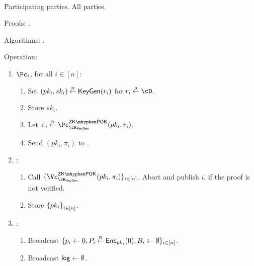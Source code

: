 \begin{protocol}~\label{prot:ConfidentialTransactions:Init}
	

	\item[Participating parties.] All parties.
			
			
	\item[Proofs:]   \piZKPOK{\rKeyGen}. 
	
	
	\item[Algorithms:]    \KeyGen.
	
			
\item[Operation:] ~
			
			
			\begin{enumerate}
				
				\item   $\Pc_i$, for  all $i\in [n]$:
				\begin{enumerate}
					\item Set $(pk_i,sk_i) \mathbin{\stackrel{\mbox{\tiny R}}{\leftarrow}} \mathsf{KeyGen}(r_i)$ for $r_i \getsr \cD$.
					
					\item Store $sk_i$.
					
					\item Let $\pi_i \getsr \pZKPOK{\rKeyGen}(pk_i,r_i)$.
					
					\item Send $(pk_i,\pi_i)$ to \Cc.
					
					
				\end{enumerate}
				
				\item \Cc:
				\begin{enumerate}
					
					\item Call $\sset{ \vZKPOK{\rKeyGen}(pk_i,\pi_i)}_{i\in [n]}$. Abort and publish $i$, if the \ith  proof is not verified. 
										
					\item Store $\set{pk_i}_{i\in [n]}$.
				\end{enumerate}
				
				
				\item \Cc: 
				\begin{enumerate}
					\item 	Broadcast $\{p_i \leftarrow 0, P_i\mathbin{\stackrel{\mbox{\tiny R}}{\leftarrow}} \mathsf{Enc}_{pk_i}(0),B_i\leftarrow \emptyset\}_{i\in [n]}$.
					
					\item    Broadcast $\mathsf{log} \leftarrow \emptyset$.
				\end{enumerate}								
			\end{enumerate}
\end{protocol}


